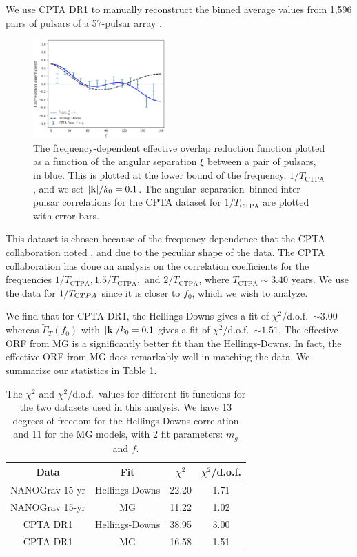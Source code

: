 \documentclass[prd,twocolumn,aps,psfig,nofootinbib,nobibnotes,superscriptaddress,preprintnumbers,times]{revtex4-2}
\begin{document}
We use CPTA DR1 to manually reconstruct the binned average values from 1,596 pairs of pulsars of a 57-pulsar array \cite{Xu:2023wog}. 
\begin{figure}[ht]
    \centering
    \includegraphics[width=0.45\textwidth]{fig3.pdf}
    \caption{The frequency-dependent effective overlap reduction function plotted as a function of the angular separation $\xi$ between a pair of pulsars, in blue. This is plotted at the lower bound of the frequency, $1/T_{\text{CTPA}}$, and we set $|{\bf k}|/k_0 = 0.1$. The angular–separation–binned inter-pulsar correlations for the CPTA dataset for $1/T_{\text{CTPA}}$ are plotted with error bars.}
    \label{fig:cpta}
\end{figure}
This dataset is chosen because of the frequency dependence that the CPTA collaboration noted \cite{Xu:2023wog}, and due to the peculiar shape of the data. The CPTA collaboration has done an analysis on the correlation coefficients for the frequencies $1/T_{\text{CTPA}}, 1.5/T_{\text{CTPA}},$ and $2/T_{\text{CTPA}}$, where $T_{\text{CTPA}} \sim 3.40$ years. We use the data for $1/T_{\text CTPA}$ since it is closer to $f_0$, which we wish to analyze. 

We find that for CPTA DR1, the Hellings-Downs gives a fit of $\chi^2$/d.o.f.\ $\sim 3.00$ whereas $\tilde{\Gamma}_T(f_0)$ with $|{\bf k}|/k_0 = 0.1$ gives a fit of $\chi^2$/d.o.f.\ $\sim 1.51$. The effective ORF from MG  is a significantly better fit than the Hellings-Downs. In fact, the effective ORF from MG does remarkably well in matching the data. We summarize our statistics in Table \ref{tbl:chi}.
\begin{table}[ht] 
\centering
\renewcommand{\arraystretch}{1.8}
\begin{tabular}{|c|c|c|c|}
\hline
\textbf{Data} & \textbf{Fit} & \textbf{$\chi^2$} & \textbf{$\chi^2$/d.o.f.} \\
\hline
NANOGrav 15-yr & Hellings-Downs & 22.20 & 1.71 \\
\hline
NANOGrav 15-yr & MG  & 11.22 & 1.02 \\
\hline
CPTA DR1 & Hellings-Downs & 38.95 & 3.00 \\
\hline
CPTA DR1 & MG  & 16.58 & 1.51 \\
\hline
\end{tabular}
\caption{The $\chi^2$ and $\chi^2$/d.o.f.\ values for different fit functions for the two datasets used in this analysis. We have 13 degrees of freedom for the Hellings-Downs correlation and 11 for the MG  models, with 2 fit parameters: $m_g$ and $f$. }
\label{tbl:chi}
\end{table}
\end{document}
